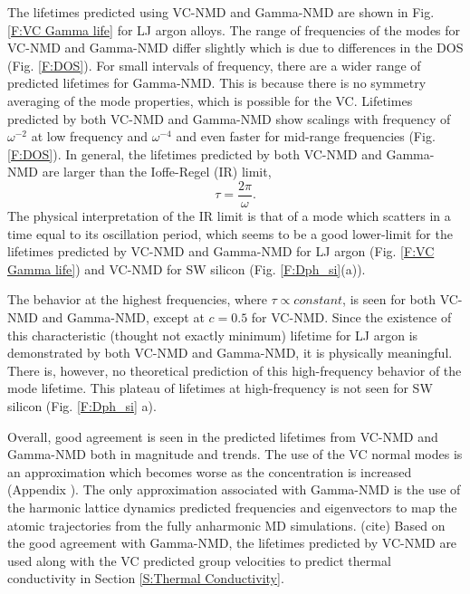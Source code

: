 \documentclass[aps,prb,onecolumn,preprint,superscriptaddress,amsmath,amssymb,floatfix]{revtex4}
\begin{document}
The lifetimes predicted using VC-NMD and Gamma-NMD  
are shown in Fig. \ref{F:VC Gamma life} for LJ argon alloys. 
The range of frequencies of the modes for 
VC-NMD and Gamma-NMD differ slightly  
which is due to differences in the DOS (Fig. \ref{F:DOS}). 
For small intervals of frequency, there are a wider range of 
predicted lifetimes for Gamma-NMD. This is because there is no symmetry 
averaging of the mode properties, which is possible for the VC.
Lifetimes predicted by both VC-NMD and Gamma-NMD show scalings with 
frequency of $\omega^{-2}$ at low frequency and $\omega^{-4}$ and 
even faster for mid-range frequencies (Fig. \ref{F:DOS}). 
In general, the lifetimes predicted by both VC-NMD and Gamma-NMD  
are larger than the Ioffe-Regel (IR) limit,
\cite{taraskin_determination_1999} 
\begin{equation}\label{EQ:IR}
\tau = \frac{2\pi}{\omega}.
\end{equation}
The physical interpretation of the IR limit is that of a mode which 
scatters in a time equal to its oscillation period, which seems to 
be a good lower-limit for the lifetimes predicted by VC-NMD and Gamma-NMD 
for LJ argon (Fig. \ref{F:VC Gamma life}) 
and VC-NMD for SW silicon (Fig. \ref{F:Dph_si}(a)). 

The behavior at the highest frequencies, 
where $\tau \propto constant$, is seen for both VC-NMD and Gamma-NMD, 
except at $c=0.5$ for VC-NMD.  
Since the existence of this 
characteristic (thought not exactly minimum) lifetime for LJ argon is 
demonstrated by both VC-NMD and Gamma-NMD, it is physically 
meaningful. There is, however, no theoretical 
prediction of this high-frequency behavior of the mode lifetime.
\cite{kittel_interpretation_1949,cahill_lattice_1988,
graebner_phonon_1986} This 
plateau of lifetimes at high-frequency is not seen for SW 
silicon (Fig. \ref{F:Dph_si} a). 

Overall, good agreement is seen in the predicted lifetimes from VC-NMD and 
Gamma-NMD both in magnitude and trends. The use of the VC normal modes 
is an approximation which becomes worse as the concentration is increased 
(Appendix ). The only approximation associated with Gamma-NMD is the use  
of the harmonic lattice dynamics predicted frequencies and eigenvectors 
to map the atomic trajectories from the fully anharmonic MD simulations.
(cite) 
Based on the good agreement with Gamma-NMD, the 
lifetimes predicted by VC-NMD are used along with the VC predicted 
group velocities to 
predict thermal conductivity in Section \ref{S:Thermal Conductivity}. 
\end{document}
